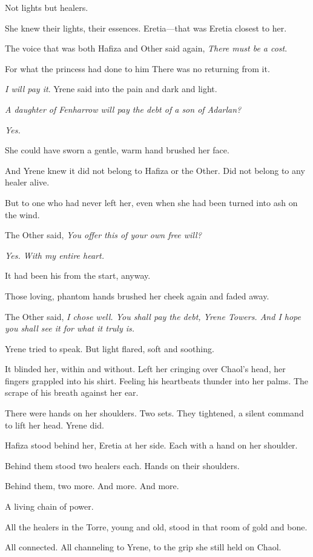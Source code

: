 Not lights  but healers.

She knew their lights, their essences. Eretia---that was Eretia closest to her.

The voice that was both Hafiza and Other said again, \emph{There must be a cost}.

For what the princess had done to him  There was no returning from it.

\emph{I will pay it}. Yrene said into the pain and dark and light.

\emph{A daughter of Fenharrow will pay the debt of a son of Adarlan?}

\emph{Yes.}

She could have sworn a gentle, warm hand brushed her face.

And Yrene knew it did not belong to Hafiza or the Other. Did not belong to any healer alive.

But to one who had never left her, even when she had been turned into ash on the wind.

The Other said, \emph{You offer this of your own free will?}

\emph{Yes. With my entire heart.}

It had been his from the start, anyway.

Those loving, phantom hands brushed her cheek again and faded away.

The Other said, \emph{I chose well. You shall pay the debt, Yrene Towers. And I hope you shall see it for what it truly is.}

Yrene tried to speak. But light flared, soft and soothing.

It blinded her, within and without. Left her cringing over Chaol's head, her fingers grappled into his shirt. Feeling his heartbeats thunder into her palms. The scrape of his breath against her ear.

There were hands on her shoulders. Two sets. They tightened, a silent command to lift her head. Yrene did.

Hafiza stood behind her, Eretia at her side. Each with a hand on her shoulder.

Behind them stood two healers each. Hands on their shoulders.

Behind them, two more. And more. And more.

A living chain of power.

All the healers in the Torre, young and old, stood in that room of gold and bone.

All connected. All channeling to Yrene, to the grip she still held on Chaol.

